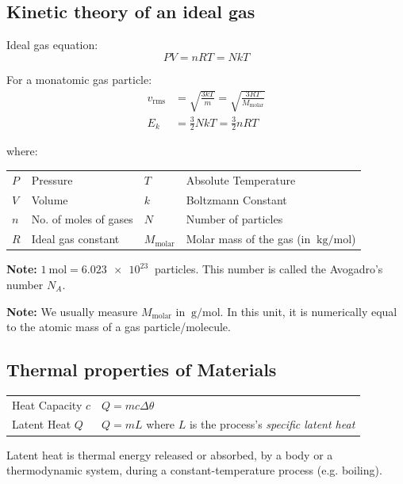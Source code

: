 \documentclass[11pt]{article}
\numberwithin{equation}{section}
\begin{document}
		\subsection{Kinetic theory of an ideal gas}
			\begin{multicols}{2}
				Ideal gas equation:
				\begin{equation*}
					PV=nRT = NkT
				\end{equation*}
				\columnbreak
				
				For a monatomic gas particle:
				\begin{align*}
					v_{\text{rms}} &= \sqrt{\frac{3kT}{m}} = \sqrt{\frac{3RT}{M_{\text{molar}}}} \\
					E_k &= \frac{3}{2}NkT = \frac{3}{2}nRT
				\end{align*}
			\end{multicols}
			\vspace{-1em}
			where:
			\begin{center}
				\renewcommand{\arraystretch}{1}
				\begin{tabular}{@{} llll @{}}
					\toprule
					$P$ & Pressure & $T$ & Absolute Temperature\\
					$V$ & Volume & $k$ & Boltzmann Constant \\
					$n$ & No. of moles of gases & $N$ & Number of particles\\
					$R$ & Ideal gas constant &$M_\text{molar}$& Molar mass of the gas (in $\SI{}{\kg\per\mole}$)\\
					\bottomrule
				\end{tabular}
			\end{center}
			\vfill
			\textbf{Note:} $\SI{1}{\mole} = \SI{6.023e23}{}$ particles. This number is called the Avogadro’s number $N_{\!A}$.
			
			\textbf{Note:} We usually measure $M_\text{molar}$ in $\SI{}{\gram\per\mole}$. In this unit, it is numerically equal to the atomic mass of a gas particle/molecule.
		\subsection{Thermal properties of Materials}
			\begin{center}
				\renewcommand{\arraystretch}{1.2}
				\begin{tabular}{@{} l l @{}}
					\toprule
					Heat Capacity $c$ & $Q = mc\Delta\theta$ \\
					Latent Heat $Q$ & $Q = mL$ where $L$ is the process's \textit{specific latent heat} \\
					\bottomrule
				\end{tabular}
			\end{center}
			\vspace{\parskip}
			Latent heat is thermal energy released or absorbed, by a body or a thermodynamic system, during a constant-temperature process (e.g. boiling).
			
\end{document}

